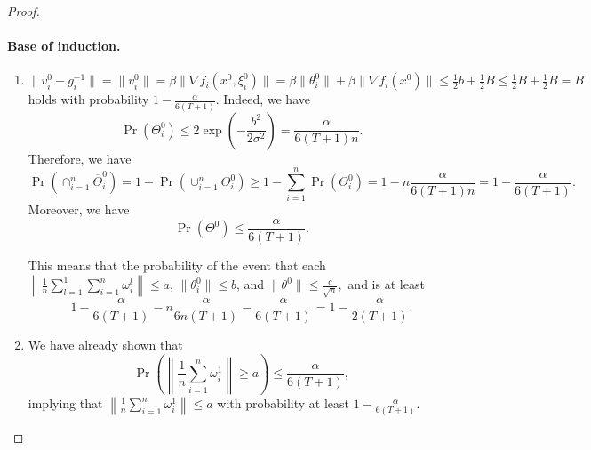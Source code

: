 \documentclass[a4paper,11pt]{article}
\begin{document}
\begin{proof}
    
    \paragraph{Base of induction.}


    
    \begin{enumerate}
        \item $\|v_i^0 - g_i^{-1}\| = \|v_i^0\| = \beta\|\nabla f_i(x^0,\xi^0_i)\| = \beta\|\theta^0_i\| + \beta \|\nabla f_i(x^0)\| \le \frac{1}{2}b + \frac{1}{2}B\le \frac{1}{2}B + \frac{1}{2}B = B$ holds with probability $1-\frac{\alpha}{6(T+1)}$. Indeed, we have 
        \[
        \Pr(\Theta^0_i) \le 2\exp\left(-\frac{b^2}{2\sigma^2}\right) = \frac{\alpha}{6(T+1)n}.
        \]
        Therefore, we have 
        \[
        \Pr\left(\cap_{i=1}^n\overline{\Theta}^0_i\right) = 1 - \Pr\left(\cup_{i=1}^n \Theta^0_i\right) \ge 1 - \sum_{i=1}^n\Pr(\Theta^0_i) = 1-n\frac{\alpha}{6(T+1)n} = 1-\frac{\alpha}{6(T+1)}.
        \]
        Moreover, we have 
        \[
        \Pr(\Theta^0) \le \frac{\alpha}{6(T+1)}.
        \]
        
        This means that the probability of the event that each $\left\|\frac{1}{n}\sum_{l=1}^1\sum_{i=1}^n\omega_i^l\right\|\le a$, $\|\theta^0_i\|\le b$, and  $\|\theta^0\|\le \frac{c}{\sqrt{n}},$ and is at least 
        $$1-\frac{\alpha}{6(T+1)} - n\frac{\alpha}{6n(T+1)} - \frac{\alpha}{6(T+1)} = 1 - \frac{\alpha}{2(T+1)}.$$
        \item We have already shown that
        \[
        \Pr\left(\left\|\frac{1}{n}\sum_{i=1}^n\omega_i^1\right\| \ge a\right) \le \frac{\alpha}{6(T+1)},
        \]
       implying that $\left\|\frac{1}{n}\sum_{i=1}^n\omega_i^1\right\| \le a$ with probability at least $1-\frac{\alpha}{6(T+1)}.$
        


\end{enumerate}
\end{proof}
\end{document}

